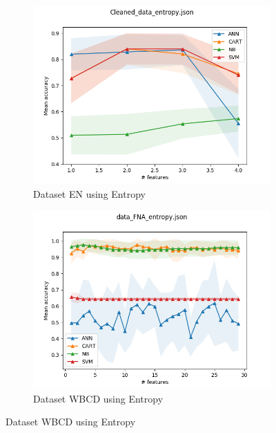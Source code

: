 \begin{figure}[htbp!]
  \centering
  \begin{subfigure}[b]{0.475\textwidth}
      \centering
      \includegraphics[width=\textwidth]{../plots_with_std_fill/Cleaned_data_entropy_combined.png}
      \caption[Network2]%
      {{\small Dataset EN using Entropy}}
      \label{fig:EN_entropy}
  \end{subfigure}
  \hfill
  \begin{subfigure}[b]{0.475\textwidth}
      \centering
      \includegraphics[width=\textwidth]{../plots_with_std_fill/data_FNA_entropy_combined.png}
      \caption[]%
      {{\small Dataset WBCD using Entropy}}
      \label{fig:WBCD_entropy}
  \end{subfigure}

\end{figure}
